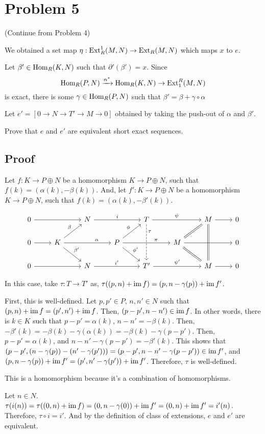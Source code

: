 \section*{Problem 5}

(Continue from Problem 4)

We obtained a set map \(\eta: \textnormal{Ext}_R^1(M, N) \to \textnormal{Ext}_R(M, N)\) which maps \(x\) to \(e\).

Let \(\beta' \in \textnormal{Hom}_R(K, N)\) such that \(\partial'(\beta') = x\).
Since
\[\textnormal{Hom}_R(P, N) \xrightarrow{\alpha^*} \textnormal{Hom}_R(K, N) \to \textnormal{Ext}_1^R(M, N)\]
is exact, there is some \(\gamma \in \textnormal{Hom}_R(P, N)\)
such that \(\beta' = \beta + \gamma \circ \alpha\)

Let \(e' = [0 \to N \to T' \to M \to 0]\)
obtained by taking the push-out of \(\alpha\) and \(\beta'\).

Prove that \(e\) and \(e'\) are equivalent short exact sequences.

\subsection*{Proof}

Let \(f: K \to P \oplus N\) be a homomorphism \(K \to P \oplus N\),
such that \(f(k) = (\alpha(k), -\beta(k))\).
And, let \(f': K \to P \oplus N\) be a homomorphism \(K \to P \oplus N\),
such that \(f(k) = (\alpha(k), -\beta'(k))\).

\[\begin{tikzcd}
  0 \ar{rr} && N \ar["i"]{rr} && T \ar["\psi"]{rr} \ar[dashed, pos=0.2, "\tau", crossing over]{dd} && M \ar{r} \ar[equal]{dd} & 0 \\
  0 \ar{r}
  & K \ar["\beta"]{ur} \ar["\beta'"]{dr} \ar[pos=0.7, "\alpha"]{rr}
  && P \ar["\phi"]{ur} \ar["\phi'"]{dr} \ar[pos=0.7, "\pi"]{rr}
  && M \ar[equal]{ur} \ar[equal]{dr} \ar{rr}
  && 0 \\
  0 \ar{rr} && N \ar["i'"]{rr} && T' \ar["\psi'"]{rr} && M \ar{r} & 0
\end{tikzcd}\]

In this case, take \(\tau: T \to T'\) as,
\(\tau((p, n) + \textnormal{im}\, f) = (p, n - \gamma(p)) + \textnormal{im}\, f'\).

First, this is well-defined.
Let \(p, p' \in P\), \(n, n' \in N\) such that \((p, n) + \textnormal{im}\, f = (p', n') + \textnormal{im}\, f\).
Then, \((p - p', n - n') \in \textnormal{im}\, f\).
In other words, there is \(k \in K\) such that
\(p - p' = \alpha(k)\),
\(n - n' = -\beta(k)\).
Then, \(-\beta'(k) = -\beta(k) - \gamma(\alpha(k)) = -\beta(k) - \gamma(p - p')\).
Then,
\(p - p' = \alpha(k)\),
and \(n - n' - \gamma(p - p') = -\beta'(k)\).
This shows that
\((p - p', (n - \gamma(p)) - (n' - \gamma(p'))) = (p - p', n - n' - \gamma(p - p')) \in \textnormal{im}\, f'\),
and
\((p, n - \gamma(p)) + \textnormal{im}\, f' = (p', n' - \gamma(p')) + \textnormal{im}\, f'\).
Therefore, \(\tau\) is well-defined.

This is a homomorphism because it's a combination of homomorphisms.

Let \(n \in N\).
\(\tau(i(n)) = \tau((0, n) + \textnormal{im}\, f) = (0, n - \gamma(0)) + \textnormal{im}\, f' = (0, n) + \textnormal{im}\, f' = i'(n)\).
Therefore, \(\tau \circ i = i'\).
And by the definition of class of extensions,
\(e\) and \(e'\) are equivalent.
\qedsq